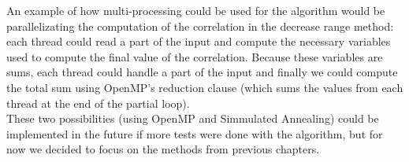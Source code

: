 An example of how multi-processing could be used for the algorithm would be parallelizating the computation of the correlation in the decrease range method: each thread could read a part of the input and compute the necessary variables used to compute the final value of the correlation. Because these variables are sums, each thread could handle a part of the input and finally we could compute the total sum using OpenMP's reduction clause (which sums the values from each thread at the end of the partial loop). \\

These two possibilities (using OpenMP and Simmulated Annealing) could be implemented in the future if more tests were done with the algorithm, but for now we decided to focus on the methods from previous chapters.